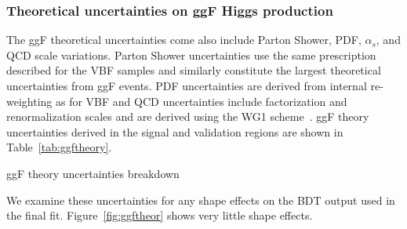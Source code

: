 \subsubsection{Theoretical uncertainties on ggF Higgs production}
The ggF theoretical uncertainties come also include Parton Shower, PDF, $\alpha_s$, and QCD scale variations. Parton Shower uncertainties use the same prescription described for the VBF samples and similarly constitute the largest theoretical uncertainties from ggF events. PDF uncertainties are derived from internal re-weighting as for VBF and QCD uncertainties include factorization and renormalization scales and are derived using the WG1 scheme~\cite{WG1}. ggF theory uncertainties derived in the signal and validation regions are shown in Table~\ref{tab:ggftheory}.
\begin{table}[h!]
\centering
\scalebox{1.0}{

}
\caption{ggF theory uncertainties breakdown}
\label{tab:ggftheory}
\end{table}

We examine these uncertainties for any shape effects on the BDT output used in the final fit. Figure~\ref{fig:ggftheor} shows very little shape effects. 

